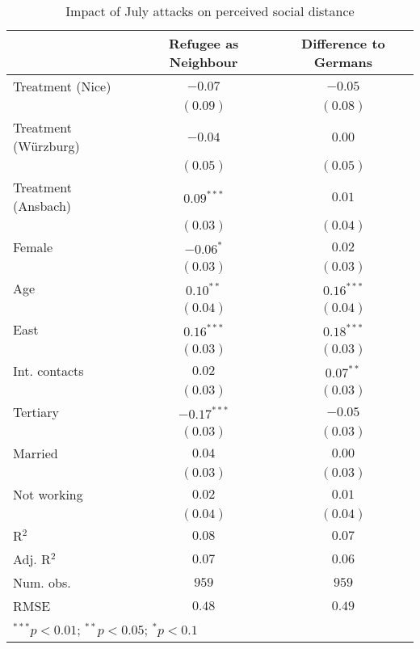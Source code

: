 
\begin{table}
\caption{Impact of July attacks on perceived social distance}
\begin{center}
\begin{tabular}{l c c}
\toprule
 & Refugee as Neighbour & Difference to Germans \\
\midrule
Treatment (Nice)     & $-0.07$       & $-0.05$      \\
                     & $(0.09)$      & $(0.08)$     \\
Treatment (Würzburg) & $-0.04$       & $0.00$       \\
                     & $(0.05)$      & $(0.05)$     \\
Treatment (Ansbach)  & $0.09^{***}$  & $0.01$       \\
                     & $(0.03)$      & $(0.04)$     \\
Female               & $-0.06^{*}$   & $0.02$       \\
                     & $(0.03)$      & $(0.03)$     \\
Age                  & $0.10^{**}$   & $0.16^{***}$ \\
                     & $(0.04)$      & $(0.04)$     \\
East                 & $0.16^{***}$  & $0.18^{***}$ \\
                     & $(0.03)$      & $(0.03)$     \\
Int. contacts        & $0.02$        & $0.07^{**}$  \\
                     & $(0.03)$      & $(0.03)$     \\
Tertiary             & $-0.17^{***}$ & $-0.05$      \\
                     & $(0.03)$      & $(0.03)$     \\
Married              & $0.04$        & $0.00$       \\
                     & $(0.03)$      & $(0.03)$     \\
Not working          & $0.02$        & $0.01$       \\
                     & $(0.04)$      & $(0.04)$     \\
\midrule
R$^2$                & $0.08$        & $0.07$       \\
Adj. R$^2$           & $0.07$        & $0.06$       \\
Num. obs.            & $959$         & $959$        \\
RMSE                 & $0.48$        & $0.49$       \\
\bottomrule
\multicolumn{3}{l}{\scriptsize{$^{***}p<0.01$; $^{**}p<0.05$; $^{*}p<0.1$}}
\end{tabular}
\label{tab_dist}
\end{center}
\end{table}
